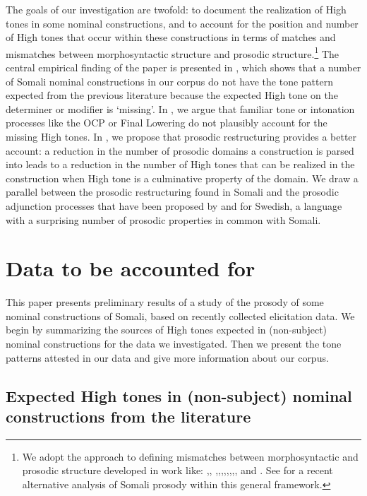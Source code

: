 \documentclass[output=paper]{langscibook}
\begin{document}
The goals of our investigation are twofold: to document the realization of High tones in some nominal constructions, and to account for the position and number of High tones that occur within these constructions in terms of matches and mismatches between morphosyntactic structure and prosodic structure.\footnote{We adopt the approach to defining mismatches between morphosyntactic and prosodic structure developed in work like: \citet{Downing1999},\citealt{Downing2016}, \citet{Inkelas1993},\citet{inkelas2014interplay},\citet{Ito2012},\citet{Ito2013},\citet{Nespor1986},\citet{Riad2012},\citet{Selkirk1986},\citet{selkirk2011syntax},\citet{Vigário2010} and \citet{vogel2010phonology}. See \citet{Green2016} for a recent alternative analysis of Somali prosody within this general framework.} The central empirical finding of the paper is presented in , which shows that a number of Somali nominal constructions in our corpus do not have the tone pattern expected from the previous literature because the expected High tone on the determiner or modifier is ‘missing’. In  , we argue that familiar tone or intonation processes like the OCP or Final Lowering do not plausibly account for the missing High tones. In  , we propose that prosodic restructuring provides a better account: a reduction in the number of prosodic domains a construction is parsed into leads to a reduction in the number of High tones that can be realized in the construction when High tone is a culminative property of the domain. We draw a parallel between the prosodic restructuring found in Somali and the prosodic adjunction processes that have been proposed by \citet{Myrberg2015} and \citet{Riad2016} for Swedish, a language with a surprising number of prosodic properties in common with Somali.


\section{Data to be accounted for}
\label{sec:downing:2}
This paper presents preliminary results of a study of the prosody of some nominal constructions of Somali, based on recently collected elicitation data. We begin by summarizing the sources of High tones expected in (non-subject) nominal constructions for the data we investigated. Then we present the tone patterns attested in our data and give more information about our corpus.


 
\subsection{Expected High tones in (non-subject) nominal constructions from the literature}
\end{document}
